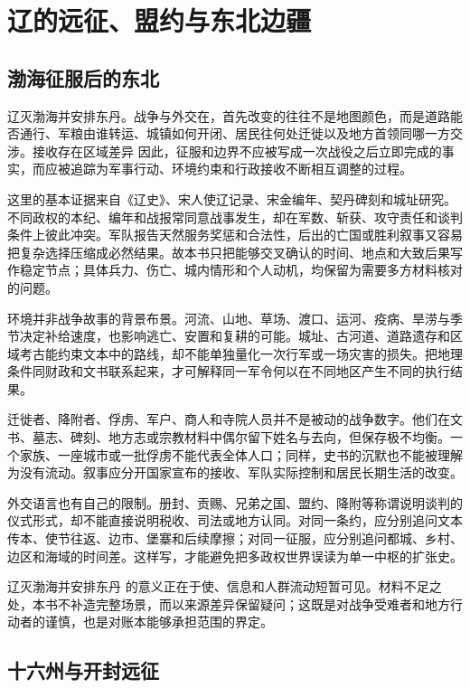 \section{辽的远征、盟约与东北边疆}

\subsection{渤海征服后的东北}

辽灭渤海并安排东丹。战争与外交在，首先改变的往往不是地图颜色，而是道路能否通行、军粮由谁转运、城镇如何开闭、居民往何处迁徙以及地方首领同哪一方交涉。接收存在区域差异 因此，征服和边界不应被写成一次战役之后立即完成的事实，而应被追踪为军事行动、环境约束和行政接收不断相互调整的过程。

这里的基本证据来自《辽史》、宋人使辽记录、宋金编年、契丹碑刻和城址研究。不同政权的本纪、编年和战报常同意战事发生，却在军数、斩获、攻守责任和谈判条件上彼此冲突。军队报告天然服务奖惩和合法性，后出的亡国或胜利叙事又容易把复杂选择压缩成必然结果。故本书只把能够交叉确认的时间、地点和大致后果写作稳定节点；具体兵力、伤亡、城内情形和个人动机，均保留为需要多方材料核对的问题。

环境并非战争故事的背景布景。河流、山地、草场、渡口、运河、疫病、旱涝与季节决定补给速度，也影响逃亡、安置和复耕的可能。城址、古河道、道路遗存和区域考古能约束文本中的路线，却不能单独量化一次行军或一场灾害的损失。把地理条件同财政和文书联系起来，才可解释同一军令何以在不同地区产生不同的执行结果。

迁徙者、降附者、俘虏、军户、商人和寺院人员并不是被动的战争数字。他们在文书、墓志、碑刻、地方志或宗教材料中偶尔留下姓名与去向，但保存极不均衡。一个家族、一座城市或一批俘虏不能代表全体人口；同样，史书的沉默也不能被理解为没有流动。叙事应分开国家宣布的接收、军队实际控制和居民长期生活的改变。

外交语言也有自己的限制。册封、贡赐、兄弟之国、盟约、降附等称谓说明谈判的仪式形式，却不能直接说明税收、司法或地方认同。对同一条约，应分别追问文本传本、使节往返、边市、堡寨和后续摩擦；对同一征服，应分别追问都城、乡村、边区和海域的时间差。这样写，才能避免把多政权世界误读为单一中枢的扩张史。

辽灭渤海并安排东丹 的意义正在于使、信息和人群流动短暂可见。材料不足之处，本书不补造完整场景，而以来源差异保留疑问；这既是对战争受难者和地方行动者的谨慎，也是对账本能够承担范围的界定。

\subsection{十六州与开封远征}

